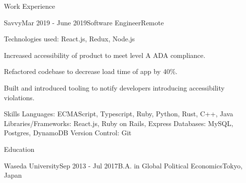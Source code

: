 \documentclass{resume} %
\begin{document}
\begin{rSection}{Work Experience}
\begin{rSubsection}{Savvy}{Mar 2019 - June 2019}{Software Engineer}{Remote}
\item Technologies used: React.js, Redux, Node.js
\item Increased accessibility of product to meet level A ADA compliance.
\item Refactored codebase to decrease load time of app by 40\%.
\item Built and introduced tooling to notify developers introducing accessibility violations.
\end{rSubsection}

\end{rSection}


\begin{rSection}{Skills}
\newline Languages: ECMAScript, Typescript, Ruby, Python, Rust, C++, Java
\newline Libraries/Frameworks: React.js, Ruby on Rails, Express
\newline Databases: MySQL, Postgres, DynamoDB
\newline Version Control: Git
\end{rSection}


\begin{rSection}{Education}

\begin{rSubsection}
{Waseda University}{Sep 2013 - Jul 2017}{B.A. in Global Political Economics}{Tokyo, Japan}
\end{rSubsection}

\end{rSection}
\end{document}
